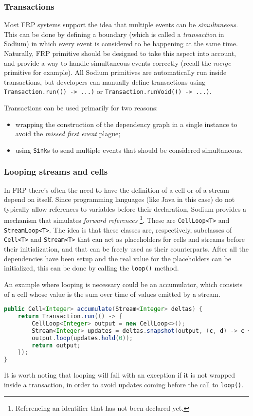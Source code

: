 \subsubsection{Transactions}
\label{sec:transactions}

Most FRP systems support the idea that multiple events can be \textit{simultaneous}.
%
This can be done by defining a boundary (which is called a \textit{transaction} in Sodium) in which every event is considered to be happening at the same time.
%
Naturally, FRP primitive should be designed to take this aspect into account, and provide a way to handle simultaneous events correctly (recall the \textit{merge} primitive for example).
%
All Sodium primitives are automatically run inside transactions, but developers can manually define transactions using \texttt{Transaction.run(() -> ...)} or \texttt{Transaction.runVoid(() -> ...)}.

Transactions can be used primarily for two reasons:
%
\begin{itemize}
    \item wrapping the construction of the dependency graph in a single instance to avoid the \textit{missed first event} plague;
    \item using \texttt{Sink}s to send multiple events that should be considered simultaneous.
\end{itemize}

\subsubsection{Looping streams and cells}

In FRP there's often the need to have the definition of a cell or of a stream depend on itself.
%
Since programming languages (like Java in this case) do not typically allow references to variables before their declaration, Sodium provides a mechanism that simulates \textit{forward references} \footnote{Referencing an identifier that has not been declared yet.}.
%
These are \texttt{CellLoop<T>} and \texttt{StreamLoop<T>}.
%
The idea is that these classes are, respectively, subclasses of \texttt{Cell<T>} and \texttt{Stream<T>} that can act as placeholders for cells and streams before their initialization, and that can be freely used as their counterparts.
%
After all the dependencies have been setup and the real value for the placeholders can be initialized, this can be done by calling the \texttt{loop()} method.

An example where looping is necessary could be an accumulator, which consists of a cell whose value is the sum over time of values emitted by a stream.
%
\begin{lstlisting}[frame=single, language=java]
public Cell<Integer> accumulate(Stream<Integer> deltas) {
    return Transaction.run(() -> {
        CellLoop<Integer> output = new CellLoop<>();
        Stream<Integer> updates = deltas.snapshot(output, (c, d) -> c + d);
        output.loop(updates.hold(0));
        return output;
    });
}
\end{lstlisting}
%
It is worth noting that looping will fail with an exception if it is not wrapped inside a transaction, in order to avoid updates coming before the call to \texttt{loop()}.
